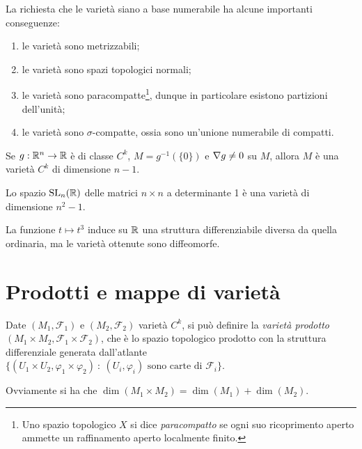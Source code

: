  \begin{remark}
  La richiesta che le varietà siano a base numerabile ha alcune importanti conseguenze:
  \begin{enumerate}
   \item le varietà sono metrizzabili;
   \item le varietà sono spazi topologici normali;
   \item le varietà sono paracompatte\footnote{Uno spazio topologico $X$ si dice \emph{paracompatto} se ogni suo ricoprimento aperto ammette un raffinamento aperto localmente finito.}, dunque in particolare esistono partizioni dell'unità; 
   \item le varietà sono $\sigma$-compatte, ossia sono un'unione numerabile di compatti.
  \end{enumerate}
 \end{remark}

\begin{exercise}
	Se $g:\mathbb R^n\to\mathbb R$ è di classe $C^k$, $M=g^{-1}(\{0\})$ e $\nabla g\ne 0$ su $M$, allora $M$ è una varietà $C^k$ di dimensione $n-1$.
\end{exercise}
\begin{exercise}
	Lo spazio $\mathrm{SL}_n(\mathbb R)$ delle matrici $n\times n$ a determinante 1 è una varietà di dimensione $n^2-1$.
\end{exercise}
\begin{exercise}
	La funzione $t\mapsto t^3$ induce su $\mathbb R$ una struttura differenziabile diversa da quella ordinaria, ma le varietà ottenute sono diffeomorfe.
\end{exercise}
 
 \section{Prodotti e mappe di varietà}
 
\begin{definition} 
	Date $(M_1,\mathcal F_1)$ e $(M_2,\mathcal F_2)$ varietà $C^k$, si può definire la \emph{varietà prodotto} $(M_1\times M_2,\mathcal F_1\times\mathcal F_2)$, che è lo spazio topologico prodotto con la struttura differenziale generata dall'atlante $\{(U_1\times U_2,\varphi_1\times\varphi_2)\ :\ \text{$(U_i,\varphi_i)$ sono carte di $\mathcal F_i$}\}$.
\end{definition}

\begin{remark}
	Ovviamente si ha che $\dim(M_1\times M_2)=\dim(M_1)+\dim(M_2)$.
\end{remark}

